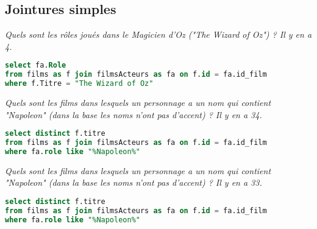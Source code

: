 \subsection{Jointures simples}
\begin{Exercise} \it 
Quels sont les rôles joués dans le Magicien d'Oz ("The Wizard of Oz") ? Il y en a 4. 
\end{Exercise}
\begin{Answer}
\begin{lstlisting}[language=SQL]
select fa.Role
from films as f join filmsActeurs as fa on f.id = fa.id_film
where f.Titre = "The Wizard of Oz"
\end{lstlisting}
\end{Answer}
\begin{Exercise} \it Quels sont les films dans lesquels un personnage a un nom qui contient "Napoleon" (dans la base les noms n'ont pas d'accent) ? 
Il y en a 34.
\end{Exercise}
\begin{Answer}
\begin{lstlisting}[language=SQL]
select distinct f.titre
from films as f join filmsActeurs as fa on f.id = fa.id_film
where fa.role like "%Napoleon%" 
\end{lstlisting}
\end{Answer}
\begin{Exercise} \it Quels sont les films dans lesquels un personnage a un nom qui contient "Napoleon" (dans la base les noms n'ont pas d'accent) ? 
Il y en a 33.
\end{Exercise}
\begin{Answer}
\begin{lstlisting}[language=SQL]
select distinct f.titre
from films as f join filmsActeurs as fa on f.id = fa.id_film
where fa.role like "%Napoleon%" 
\end{lstlisting}
\end{Answer}
